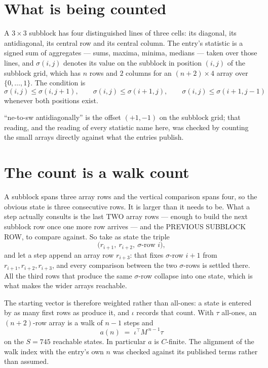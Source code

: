 \documentclass[11pt,a4paper]{article}
\theoremstyle{plain}
\theoremstyle{definition}
\begin{document}
\section{What is being counted}

A $3\times3$ subblock has four distinguished lines of three cells: its diagonal, its
antidiagonal, its central row and its central column. The entry's statistic is a signed sum of
aggregates --- sums, maxima, minima, medians --- taken over those lines, and $\sigma(i,j)$
denotes its value on the subblock in position $(i,j)$ of the subblock grid, which has $n$ rows
and $2$ columns for an $(n+2)\times4$ array over $\{0,\dots,1\}$. The condition is
\[
\sigma(i,j)\le\sigma(i,j+1),\qquad \sigma(i,j)\le\sigma(i+1,j),\qquad \sigma(i,j)\le\sigma(i+1,j-1)
\]
whenever both positions exist.

``ne-to-sw antidiagonally'' is the offset $(+1,-1)$ on the subblock grid; that reading, and
the reading of every statistic name here, was checked by counting the small arrays directly
against what the entries publish.

\section{The count is a walk count}

A subblock spans three array rows and the vertical comparison spans four, so the obvious state
is three consecutive rows. It is larger than it needs to be. What a step actually consults is
the last TWO array rows --- enough to build the next subblock row once one more row arrives ---
and the PREVIOUS SUBBLOCK ROW, to compare against. So take as state the triple
\[
\bigl(r_{i+1},\ r_{i+2},\ \sigma\text{-row }i\bigr),
\]
and let a step append an array row $r_{i+3}$: that fixes $\sigma$-row $i+1$ from
$r_{i+1},r_{i+2},r_{i+3}$, and every comparison between the two $\sigma$-rows is settled
there. All the third rows that produce the same $\sigma$-row collapse into one state, which is
what makes the wider arrays reachable.

The starting vector is therefore weighted rather than all-ones: a state is entered by as many
first rows as produce it, and $\iota$ records that count. With $\tau$ all-ones, an
$(n+2)$-row array is a walk of $n-1$ steps and
\[
a(n)\;=\;\iota^{\!\top}M^{\,n-1}\tau
\]
on the $S=745$ reachable states. In particular $a$ is $C$-finite. The alignment of the walk
index with the entry's own $n$ was checked against its published terms rather than assumed.
\end{document}
